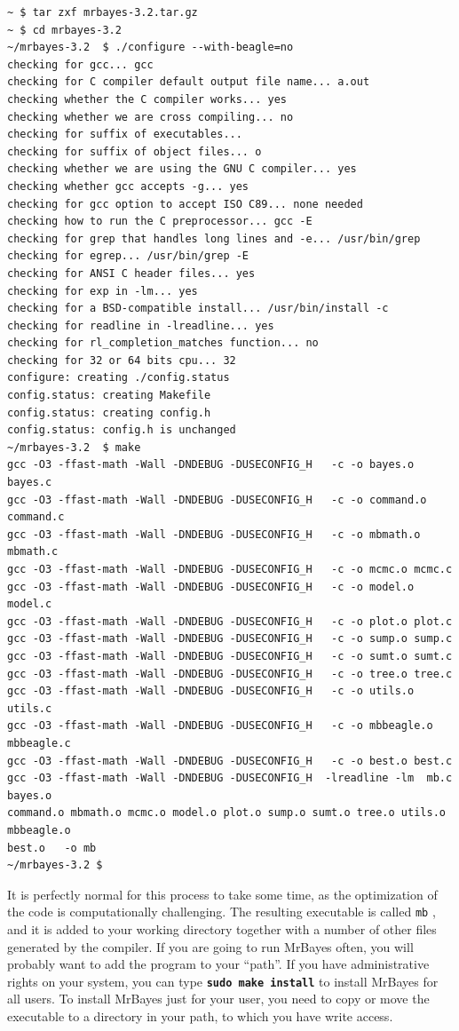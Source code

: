 \documentclass[12pt]{book}
\newcommand{\ttt}[1]{\texttt{#1} }
\newcommand{\tb}[1]{\ttt{\textbf{#1}} }
\begin{document}
\begin{singlespacing}
\small
\begin{verbatim}
~ $ tar zxf mrbayes-3.2.tar.gz
~ $ cd mrbayes-3.2
~/mrbayes-3.2  $ ./configure --with-beagle=no
checking for gcc... gcc
checking for C compiler default output file name... a.out
checking whether the C compiler works... yes
checking whether we are cross compiling... no
checking for suffix of executables... 
checking for suffix of object files... o
checking whether we are using the GNU C compiler... yes
checking whether gcc accepts -g... yes
checking for gcc option to accept ISO C89... none needed
checking how to run the C preprocessor... gcc -E
checking for grep that handles long lines and -e... /usr/bin/grep
checking for egrep... /usr/bin/grep -E
checking for ANSI C header files... yes
checking for exp in -lm... yes
checking for a BSD-compatible install... /usr/bin/install -c
checking for readline in -lreadline... yes
checking for rl_completion_matches function... no
checking for 32 or 64 bits cpu... 32
configure: creating ./config.status
config.status: creating Makefile
config.status: creating config.h
config.status: config.h is unchanged
~/mrbayes-3.2  $ make
gcc -O3 -ffast-math -Wall -DNDEBUG -DUSECONFIG_H   -c -o bayes.o bayes.c
gcc -O3 -ffast-math -Wall -DNDEBUG -DUSECONFIG_H   -c -o command.o command.c
gcc -O3 -ffast-math -Wall -DNDEBUG -DUSECONFIG_H   -c -o mbmath.o mbmath.c
gcc -O3 -ffast-math -Wall -DNDEBUG -DUSECONFIG_H   -c -o mcmc.o mcmc.c
gcc -O3 -ffast-math -Wall -DNDEBUG -DUSECONFIG_H   -c -o model.o model.c
gcc -O3 -ffast-math -Wall -DNDEBUG -DUSECONFIG_H   -c -o plot.o plot.c
gcc -O3 -ffast-math -Wall -DNDEBUG -DUSECONFIG_H   -c -o sump.o sump.c
gcc -O3 -ffast-math -Wall -DNDEBUG -DUSECONFIG_H   -c -o sumt.o sumt.c
gcc -O3 -ffast-math -Wall -DNDEBUG -DUSECONFIG_H   -c -o tree.o tree.c
gcc -O3 -ffast-math -Wall -DNDEBUG -DUSECONFIG_H   -c -o utils.o utils.c
gcc -O3 -ffast-math -Wall -DNDEBUG -DUSECONFIG_H   -c -o mbbeagle.o mbbeagle.c
gcc -O3 -ffast-math -Wall -DNDEBUG -DUSECONFIG_H   -c -o best.o best.c
gcc -O3 -ffast-math -Wall -DNDEBUG -DUSECONFIG_H  -lreadline -lm  mb.c bayes.o
command.o mbmath.o mcmc.o model.o plot.o sump.o sumt.o tree.o utils.o mbbeagle.o
best.o   -o mb
~/mrbayes-3.2 $ 
\end{verbatim}
\normalsize
\end{singlespacing}

It is perfectly normal for this process to take some time, as the optimization of the code is
computationally challenging. The resulting executable is called \ttt{mb}, and it is added to your
working directory together with a number of other files generated by the compiler.  If you are
going to run MrBayes often, you will probably want to add the program to your ``path''.  If you
have administrative rights on your system, you can type \tb{sudo make install} to install MrBayes
for all users. To install MrBayes just for your user, you need to copy or move the executable to a
directory in your path, to which you have write access.
\end{document}
